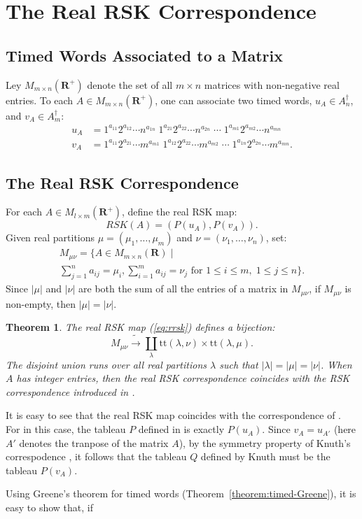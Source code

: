 \documentclass[12pt]{amsart}
\newtheorem{theorem}{Theorem}[subsection]
\theoremstyle{definition}
\newcommand{\ttab}{\mathrm{tt}}
\newcommand{\RR}{\mathbf R}
\begin{document}
\section{The Real RSK Correspondence}
\label{sec:real-rsk-corr}
\subsection{Timed Words Associated to a Matrix}
\label{sec:timed-wds-matrix}
Ley $M_{m\times n}(\RR^+)$ denote the set of all $m\times n$ matrices with non-negative real entries.
To each $A\in M_{m\times n}(\RR^+)$, one can associate two timed words, $u_A\in A_n^\dagger$, and $v_A\in A_m^\dagger$:
\begin{align*}
  u_A & = 1^{a_{11}} 2^{a_{12}}\dotsb n^{a_{1n}}\;1^{a_{21}} 2^{a_{22}}\dotsb n^{a_{2n}}\;\dotsb \;1^{a_{m1}} 2^{a_{m2}}\dotsb n^{a_{mn}}\\
  v_A & = 1^{a_{11}} 2^{a_{21}}\dotsb m^{a_{m1}}\;1^{a_{12}} 2^{a_{22}}\dotsb m^{a_{m2}}\;\dotsb \;1^{a_{1n}} 2^{a_{2n}}\dotsb m^{a_{mn}}.
\end{align*}
\subsection{The Real RSK Correspondence}
\label{sec:real-rsk-corr-subsec}
For each $A\in M_{l\times m}(\RR^+)$, define the real RSK map:
\begin{equation}
  \label{eq:rrsk}
  RSK(A) = (P(u_A), P(v_A)).
\end{equation}
Given real partitions $\mu=(\mu_1,\dotsc,\mu_m)$ and $\nu=(\nu_1,\dotsc,\nu_n)$, set:
\begin{multline*}
  M_{\mu\nu} = \{A\in M_{m\times n}(\RR)\mid \\
  \sum_{j=1}^n a_{ij} = \mu_i, \sum_{i=1}^m a_{ij}=\nu_j \text{ for }1\leq i \leq m,\; 1\leq j\leq n\}.
\end{multline*}
Since $|\mu|$ and $|\nu|$ are both the sum of all the entries of a matrix in $M_{\mu\nu}$, if $M_{\mu\nu}$ is non-empty, then $|\mu|=|\nu|$.
\begin{theorem}
  The real RSK map (\ref{eq:rrsk}) defines a bijection:
  \begin{displaymath}
    M_{\mu\nu} \tilde{\to} \coprod_\lambda \ttab(\lambda,\nu)\times \ttab(\lambda,\mu).
  \end{displaymath}
  The disjoint union runs over all real partitions $\lambda$ such that $|\lambda|=|\mu|=|\nu|$.
  When $A$ has integer entries, then the real RSK correspondence coincides with the RSK correspondence introduced in \cite[Section~3]{knuth}.
\end{theorem}
It is easy to see that the real RSK map coincides with the correspondence of \cite[Section~3]{knuth}.
For in this case, the tableau $P$ defined in \cite{knuth} is exactly $P(u_A)$.
Since $v_A = u_{A'}$ (here $A'$ denotes the tranpose of the matrix $A$), by the symmetry property of Knuth's correspodence \cite[Theorem~3]{knuth}, it follows that the tableau $Q$ defined by Knuth must be the tableau $P(v_A)$.


Using Greene's theorem for timed words (Theorem~\ref{theorem:timed-Greene}), it is easy to show that, if 



\end{document}
